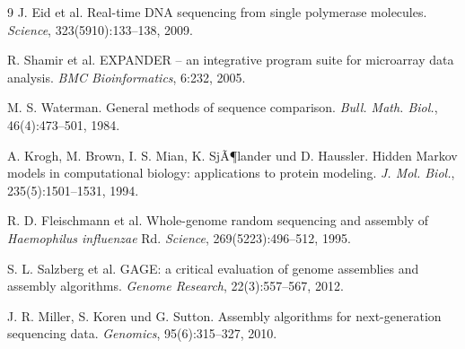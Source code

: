 ﻿\documentclass[a4paper,12pt]{article}
\theoremstyle{definition}
\begin{document}
\begin{thebibliography}{9}
    J. Eid et al.
    Real-time DNA sequencing from single polymerase molecules.
    \textit{Science}, 323(5910):133--138, 2009.

    R. Shamir et al.
    EXPANDER -- an integrative program suite for microarray data analysis.
    \textit{BMC Bioinformatics}, 6:232, 2005.

    M. S. Waterman.
    General methods of sequence comparison.
    \textit{Bull. Math. Biol.}, 46(4):473--501, 1984.

    A. Krogh, M. Brown, I. S. Mian, K. SjÃ¶lander und D. Haussler.
    Hidden Markov models in computational biology: applications to protein modeling.
    \textit{J. Mol. Biol.}, 235(5):1501--1531, 1994.

    R. D. Fleischmann et al.
    Whole-genome random sequencing and assembly of \textit{Haemophilus influenzae} Rd.
    \textit{Science}, 269(5223):496--512, 1995.

    S. L. Salzberg et al.
    GAGE: a critical evaluation of genome assemblies and assembly algorithms.
    \textit{Genome Research}, 22(3):557--567, 2012.

    J. R. Miller, S. Koren und G. Sutton.
    Assembly algorithms for next-generation sequencing data.
    \textit{Genomics}, 95(6):315--327, 2010.

\end{thebibliography}
\end{document}

